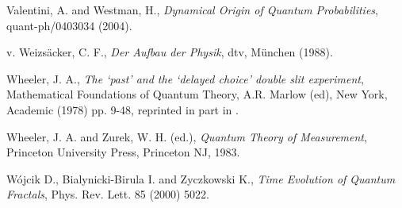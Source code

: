 \begin{thebibliography}{10}
  Valentini, A. and Westman, H., {\em Dynamical Origin of
    Quantum Probabilities}, quant-ph/0403034 (2004).

 v. Weizs\"acker, C. F., {\em Der Aufbau der Physik}, dtv, M\"unchen (1988).

 Wheeler, J. A., {\em The `past' and the `delayed choice' double slit experiment},  Mathematical Foundations of Quantum 
Theory, A.R. Marlow (ed), New York,  Academic (1978) pp. 9-48, reprinted in part in \cite{zurek}.


 Wheeler, J. A.  and Zurek, W. H. (ed.), {\em Quantum Theory of Measurement}, Princeton University 
  Press, Princeton NJ, 1983. 

 W\'ojcik D., Bialynicki-Birula I. and Zyczkowski K., {\em Time Evolution of Quantum Fractals}, Phys. Rev. Lett. 85 (2000) 5022.




\end{thebibliography}




